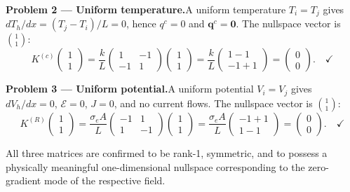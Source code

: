 \documentclass[11pt, a4paper]{article}
\begin{document}
\medskip
\noindent\textbf{Problem 2 --- Uniform temperature.}\quad A uniform temperature $T_i = T_j$ gives $dT_h/dx = (T_j - T_i)/L = 0$, hence $q^c = 0$ and $\mathbf{q}^c = \mathbf{0}$.  The nullspace vector is $\binom{1}{1}$:
\[
K^{(c)}\!\begin{pmatrix}1\\1\end{pmatrix}
=\frac{k}{L}\!\begin{pmatrix}1&-1\\-1&1\end{pmatrix}\!\begin{pmatrix}1\\1\end{pmatrix}
=\frac{k}{L}\!\begin{pmatrix}1-1\\-1+1\end{pmatrix}
=\begin{pmatrix}0\\0\end{pmatrix}.\quad\checkmark
\]

\medskip
\noindent\textbf{Problem 3 --- Uniform potential.}\quad A uniform potential $V_i = V_j$ gives $dV_h/dx = 0$, $\mathcal{E} = 0$, $J = 0$, and no current flows.  The nullspace vector is $\binom{1}{1}$:
\[
K^{(R)}\!\begin{pmatrix}1\\1\end{pmatrix}
=\frac{\sigma_e A}{L}\!\begin{pmatrix}-1&1\\1&-1\end{pmatrix}\!\begin{pmatrix}1\\1\end{pmatrix}
=\frac{\sigma_e A}{L}\!\begin{pmatrix}-1+1\\1-1\end{pmatrix}
=\begin{pmatrix}0\\0\end{pmatrix}.\quad\checkmark
\]

\medskip
All three matrices are confirmed to be rank-1, symmetric, and to possess a physically meaningful one-dimensional nullspace corresponding to the zero-gradient mode of the respective field.

\end{document}
